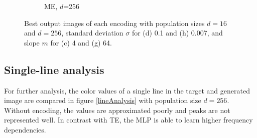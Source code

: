 \begin{figure}[!h]
\begin{subfigure}{.25\textwidth}
    \caption{ME, $d$=256}
    \label{ME256}
  \end{subfigure}\hfil
  
\caption{Best output images of each encoding with population sizes $d=16$ and $d=256$, standard deviation $\sigma$ for (d) 0.1 and (h) 0.007, and slope $m$ for (c) 4 and (g) 64.}
\label{outputImages}
\end{figure}


\subsection{Single-line analysis}
For further analysis, the color values of a single line in the target and generated image are compared in figure \ref{lineAnalysis} with population size $d=256$. Without encoding, the values are approximated poorly and peaks are not represented well. In contrast with TE, the MLP is able to learn higher frequency dependencies.



